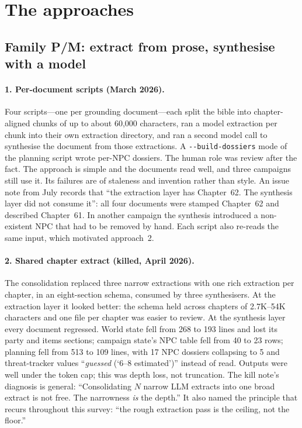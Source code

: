 \documentclass[11pt]{article}
\begin{document}
\section{The approaches}
\label{sec:approaches}

\subsection{Family P/M: extract from prose, synthesise with a model}

\paragraph{1. Per-document scripts (March 2026).}
Four scripts---one per grounding document---each split the bible into chapter-aligned chunks of up
to about 60{,}000 characters, ran a model extraction per chunk into their own extraction directory,
and ran a second model call to synthesise the document from those extractions. A
\texttt{-{}-build-dossiers} mode of the planning script wrote per-NPC dossiers. The human role was
review after the fact. The approach is simple and the documents read well, and three campaigns still
use it. Its failures are of staleness and invention rather than style. An issue note from July
records that ``the extraction layer has Chapter~62. The synthesis layer did not consume it'': all four
documents were stamped Chapter~62 and described Chapter~61. In another campaign the synthesis
introduced a non-existent NPC that had to be removed by hand. Each script also re-reads the same
input, which motivated approach~2.

\paragraph{2. Shared chapter extract (killed, April 2026).}
The consolidation replaced three narrow extractions with one rich extraction per chapter, in an
eight-section schema, consumed by three synthesisers. At the extraction layer it looked better: the
schema held across chapters of 2.7K--54K characters and one file per chapter was easier to review. At
the synthesis layer every document regressed. World state fell from 268 to 193 lines and lost its
party and items sections; campaign state's NPC table fell from 40 to 23 rows; planning fell from 513
to 109 lines, with 17 NPC dossiers collapsing to 5 and threat-tracker values ``\emph{guessed}
(`6--8 estimated')'' instead of read. Outputs were well under the token cap; this was depth loss, not
truncation. The kill note's diagnosis is general: ``Consolidating $N$ narrow LLM extracts into one
broad extract is not free. The narrowness \emph{is} the depth.'' It also named the principle that
recurs throughout this survey: ``the rough extraction pass is the ceiling, not the floor.''
\end{document}
